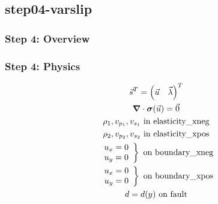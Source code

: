 \documentclass[aspectratio=169]{beamer}
\begin{document}
\subsection{step04-varslip}

\begin{frame}
  \frametitle{Step 4: Overview}

      
\end{frame}

\begin{frame}
  \frametitle{Step 4: Physics}
  \summary{}

  \begin{minipage}{0.35\textwidth}
    {\scriptsize
    \begin{gather*}
    \vec{s}^T = \left( \vec{u} \quad \vec{\lambda} \right)^T \\
    \bm{\nabla} \cdot \bm{\sigma}(\vec{u}) = \vec{0} \\
    \rho_1, v_{p_1}, v_{s_1} \text{ in elasticity\_xneg} \\ 
    \rho_2, v_{p_2}, v_{s_2} \text{ in elasticity\_xpos} \\ 
    \left. \begin{array}{c} u_x = 0 \\ u_y = 0 \end{array}\right\} \text{ on boundary\_xneg} \\
    \left. \begin{array}{c} u_x = 0 \\ u_y = 0 \end{array}\right\} \text{ on boundary\_xpos} \\
    d = d(y) \text{ on fault}
    \end{gather*}}
  \end{minipage}
  \hfill
  \begin{minipage}{0.60\textwidth}
  \end{minipage}
      
\end{frame}
\end{document}

